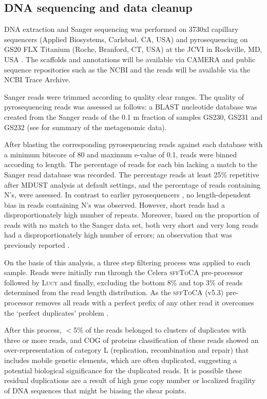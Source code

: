 \subsection{\textsc{DNA} sequencing and data cleanup}
\textsc{DNA} extraction and Sanger sequencing was performed on 3730xl capillary sequencers (Applied Biosystems, Carlsbad, \textsc{CA}, \textsc{USA}) and pyrosequencing on \textsc{GS20 FLX} Titanium (Roche, Branford, \textsc{CT}, \textsc{USA}) at the \acl{JCVI} in Rockville, \textsc{MD}, \textsc{USA} \cite{Rusch2007}. 
The scaffolds and annotations will be available via \ac{CAMERA} and public sequence repositories such as the \ac{NCBI} and the reads will be available via the \ac{NCBI} Trace Archive. 

Sanger reads were trimmed according to quality clear ranges.
The quality of pyrosequencing reads was assessed as follows: 
a \ac{BLAST} nucleotide database was created from the Sanger reads of the 0.1 \textmu{}m fraction of samples GS230, GS231 and GS232 (see  for summary of the metagenomic data).

After blasting the corresponding pyrosequencing reads against each database with a minimum bitscore of 80 and maximum e-value of 0.1, reads were binned according to length.
The percentage of reads for each bin lacking a match to the Sanger read database was recorded. 
The percentage reads at least 25\% repetitive after \textsc{MDUST} \cite{Morgulis2006} analysis at default settings, and the percentage of reads containing N's, were assessed. 
In contrast to earlier pyrosequencers \cite{Huse2007}, no length-dependent bias in reads containing N's was observed. 
However, short reads had a disproportionately high number of repeats. 
Moreover, based on the proportion of reads with no match to the Sanger data set, both very short and very long reads had a disproportionately high number of errors; an observation that was previously reported \cite{Huse2007}.

On the basis of this analysis, a three step filtering process was applied to each sample. 
Reads were initially run through the Celera \textsc{sffToCA} \cite{Miller2008} pre-processor followed by \textsc{Lucy} \cite{Chou2001} and finally, excluding the bottom 8\% and top 3\% of reads determined from the read length distribution. 
As the \textsc{sffToCA} (v5.3) pre-processor removes all reads with a perfect prefix of any other read it overcomes the `perfect duplicates’ problem \cite{Gomez-Alvarez2009}.
 
After this process, $<$5\% of the reads belonged to clusters of duplicates with three or more reads, and \ac{COG} of proteins classification of these reads showed an over-representation of category L (replication, recombination and repair) that includes mobile genetic elements, which are often duplicated, suggesting a potential biological significance for the duplicated reads. 
It is possible these residual duplications are a result of high gene copy number or localized fragility of DNA sequences that might be biasing the shear points.


